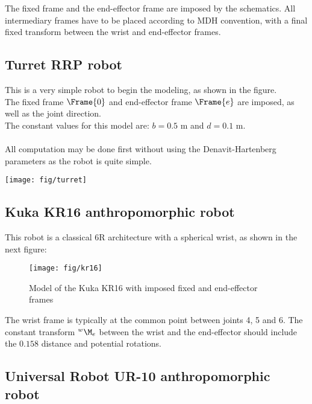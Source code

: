 \documentclass{ecnreport}
\begin{document}
  The fixed frame and the end-effector frame are imposed by the schematics. 
  All intermediary frames have to be placed according to MDH convention, with a final fixed transform between the wrist and end-effector frames.
  
  \subsection{Turret RRP robot}
  
  \begin{minipage}{.8\linewidth}
    This is a very simple robot to begin the modeling, as shown in the figure.\\
    The fixed frame $\Frame{0}$ and end-effector frame $\Frame{e}$ are imposed, as well as the joint direction.\\
    The constant values for this model are: $b = 0.5$ m and $d = 0.1$ m.\\~\\
    All computation may be done first without using the Denavit-Hartenberg parameters as the robot is quite simple. 
  \end{minipage}
  \begin{minipage}{.2\linewidth}
    \texttt{[image: fig/turret]}\label{turret}
  \end{minipage}
  
  \subsection{Kuka KR16 anthropomorphic robot}
  
  This robot is a classical 6R architecture with a spherical wrist, as shown in the next figure:
  
  \begin{figure}[h!]\centering
    \texttt{[image: fig/kr16]}
    \caption{Model of the Kuka KR16 with imposed fixed and end-effector frames}
  \end{figure}
  
  The wrist frame is typically at the common point between joints 4, 5 and 6.
  The constant transform $\wMe$ between the wrist and the end-effector should include the $0.158$ distance and potential rotations.
  
  \subsection{Universal Robot UR-10 anthropomorphic robot}
  
\end{document}
